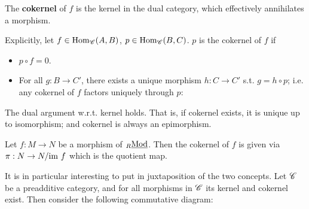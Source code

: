 \documentclass{article}
\begin{document}
\begin{definition}[Cokernel]
    The \textbf{cokernel} of $f$ is the kernel in the dual category, which effectively annihilates a morphism.

    Explicitly, let $f \in \mathrm{Hom}_{\mathscr{C}}(A, B)$, $p \in \mathrm{Hom}_{\mathscr{C}}(B, C)$. $p$ is the cokernel of $f$ if
    \begin{itemize}
        \item $p \circ f = 0$.
        \item For all $g: B \to C'$, there exists a unique morphism $h: C \to C'$ s.t. $g = h \circ p$; i.e. any cokernel of $f$ factors uniquely through $p$:
    \end{itemize}
    \begin{figure}[htbp]
        \centering
    \end{figure}
\end{definition}

\begin{remark}
    The dual argument w.r.t. kernel holds. That is, if cokernel exists, it is unique up to isomorphism; and cokernel is always an epimorphism.
\end{remark}

\begin{example}
    Let $f: M \to N$ be a morphism of ${}_{R}\underline{\textup{Mod}}$. Then the cokernel of $f$ is given via $\pi: N \to N/\mathrm{im}\  f$ which is the quotient map.
\end{example}

It is in particular interesting to put in juxtaposition of the two concepts. Let $\mathscr{C}$ be a preadditive category, and for all morphisms in $\mathscr{C}$ its kernel and cokernel exist. Then consider the following commutative diagram:
\begin{figure}[htbp]
    \centering
\end{figure}
\end{document}
